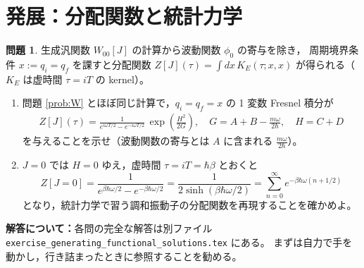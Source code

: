 \documentclass[dvipdfmx, uplatex]{jsarticle}
\theoremstyle{definition}
\newtheorem{prob}{問題}
\begin{document}
\section{発展：分配関数と統計力学}

\begin{prob}\label{prob:Z}
生成汎関数 $W_{00}[J]$ の計算から波動関数 $\phi_0$ の寄与を除き，
周期境界条件 $x:=q_i=q_f$ を課すと分配関数
$Z[J](\tau)=\int dx\,K_E(\tau;x,x)$ が得られる（$K_E$ は虚時間 $\tau=iT$ の kernel）。
\begin{enumerate}
\item 問題 \ref{prob:W} とほぼ同じ計算で，$q_i=q_f=x$ の 1 変数 Fresnel 積分が
\begin{align}
    Z[J](\tau)
    =\frac{1}{e^{i\omega T/2}-e^{-i\omega T/2}}\,\exp\!\left(\frac{H^2}{2G}\right),
    \quad
    G=A+B-\frac{m\omega}{2\hbar},\quad H=C+D
\end{align}
を与えることを示せ（波動関数の寄与とは $A$ に含まれる $\frac{m\omega}{2\hbar}$）。
\item $J=0$ では $H=0$ ゆえ，虚時間 $\tau=iT=\hbar\beta$ とおくと
\[
    Z[J=0]=\frac{1}{e^{\beta\hbar\omega/2}-e^{-\beta\hbar\omega/2}}
    =\frac{1}{2\sinh(\beta\hbar\omega/2)}
    =\sum_{n=0}^{\infty}e^{-\beta\hbar\omega(n+1/2)}
\]
となり，統計力学で習う調和振動子の分配関数を再現することを確かめよ。
\end{enumerate}
\end{prob}

\bigskip
\noindent\textbf{解答について：}各問の完全な解答は別ファイル
\texttt{exercise\_generating\_functional\_solutions.tex} にある。
まずは自力で手を動かし，行き詰まったときに参照することを勧める。
\end{document}
